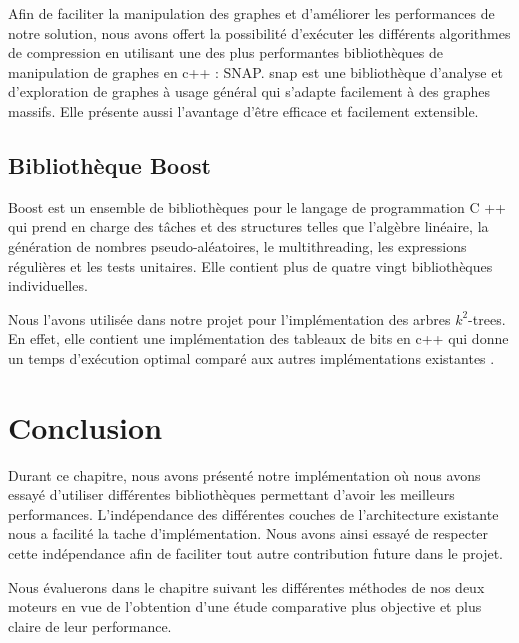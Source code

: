 		Afin de faciliter la manipulation des graphes et d'améliorer les performances de notre solution, nous avons offert la possibilité d'exécuter les différents algorithmes de compression en utilisant une des plus performantes bibliothèques de manipulation de graphes en c++ : SNAP.
		\gls{snap} est une bibliothèque d'analyse et d'exploration de graphes à usage général qui s'adapte facilement à des graphes massifs. Elle présente aussi l'avantage d'être  efficace et facilement extensible. 
		
		\subsection{Bibliothèque Boost}
		

Boost est un ensemble de bibliothèques pour le langage de programmation C ++ qui prend en charge des tâches et des structures telles que l'algèbre linéaire, la génération de nombres pseudo-aléatoires, le multithreading, les expressions régulières et les tests unitaires. Elle contient plus de quatre vingt bibliothèques individuelles.

Nous l'avons utilisée dans notre projet pour l'implémentation des arbres $k^2$-trees. En effet, elle contient une implémentation des tableaux de bits en c++ qui donne un temps d'exécution optimal comparé aux autres implémentations existantes \citep{pieterse2010performance}.  


	\section{Conclusion}
	
Durant ce chapitre, nous avons présenté notre implémentation où nous avons essayé d'utiliser différentes bibliothèques permettant d'avoir les meilleurs performances. L'indépendance des différentes couches de l'architecture existante nous a facilité la tache d'implémentation. Nous avons ainsi essayé de respecter cette indépendance afin de faciliter tout autre contribution future dans le projet. 

Nous évaluerons dans le chapitre suivant les différentes méthodes de nos deux moteurs en vue de l'obtention d'une étude comparative plus objective et plus claire de leur performance.